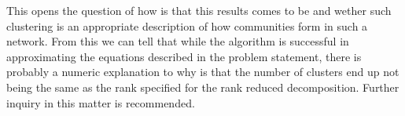\documentclass[11pt,letter]{article}%
\numberwithin{equation}{section}
\begin{document}
This opens the question of how is that this results comes to be and wether such clustering is an appropriate description of how communities form in such a network. From this we can tell that while the algorithm is successful in approximating the equations described in the problem statement, there is probably a numeric explanation to why is that the number of clusters end up not being the same as the rank specified for the rank reduced decomposition. Further inquiry in this matter is recommended. 


\clearpage
\end{document}
